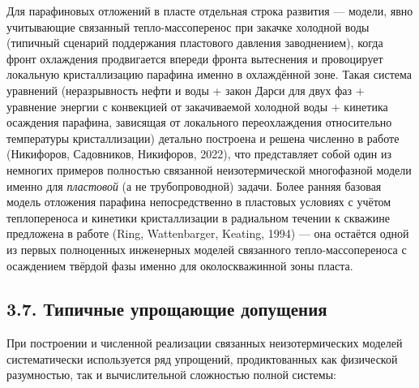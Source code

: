 \documentclass[11pt]{extarticle}
\begin{document}
Для парафиновых отложений в пласте отдельная строка развития --- модели, явно учитывающие связанный тепло-массоперенос при закачке холодной воды (типичный сценарий поддержания пластового давления заводнением), когда фронт охлаждения продвигается впереди фронта вытеснения и провоцирует локальную кристаллизацию парафина именно в охлаждённой зоне. Такая система уравнений (неразрывность нефти и воды + закон Дарси для двух фаз + уравнение энергии с конвекцией от закачиваемой холодной воды + кинетика осаждения парафина, зависящая от локального переохлаждения относительно температуры кристаллизации) детально построена и решена численно в работе (Никифоров, Садовников, Никифоров, 2022), что представляет собой один из немногих примеров полностью связанной неизотермической многофазной модели именно для \emph{пластовой} (а не трубопроводной) задачи. Более ранняя базовая модель отложения парафина непосредственно в пластовых условиях с учётом теплопереноса и кинетики кристаллизации в радиальном течении к скважине предложена в работе (Ring, Wattenbarger, Keating, 1994) --- она остаётся одной из первых полноценных инженерных моделей связанного тепло-массопереноса с осаждением твёрдой фазы именно для околоскважинной зоны пласта.

\subsection{3.7. Типичные упрощающие допущения}\label{ux442ux438ux43fux438ux447ux43dux44bux435-ux443ux43fux440ux43eux449ux430ux44eux449ux438ux435-ux434ux43eux43fux443ux449ux435ux43dux438ux44f}

При построении и численной реализации связанных неизотермических моделей систематически используется ряд упрощений, продиктованных как физической разумностью, так и вычислительной сложностью полной системы:
\end{document}
